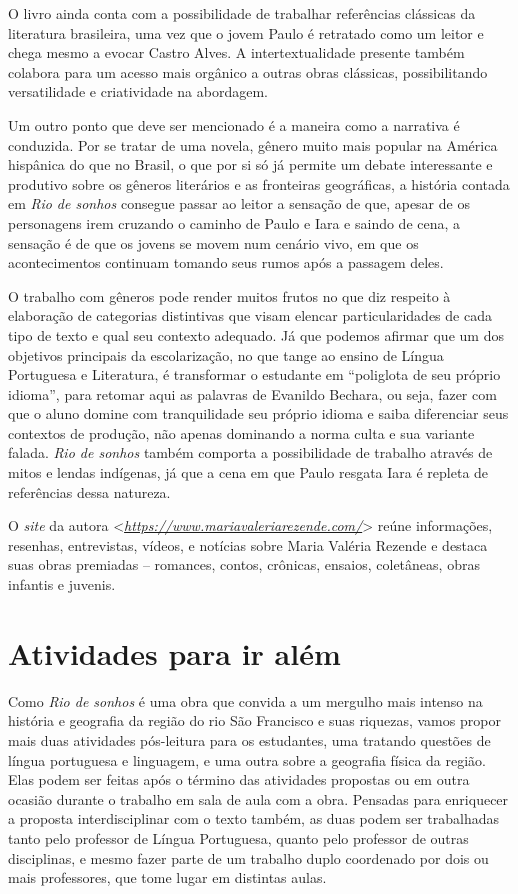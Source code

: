 \documentclass{extarticle}
\begin{document}
  O livro ainda conta com a possibilidade de trabalhar referências
  clássicas da literatura brasileira, uma vez que o jovem Paulo é
  retratado como um leitor e chega mesmo a evocar Castro Alves. A
  intertextualidade presente também colabora para um acesso mais
  orgânico a outras obras clássicas, possibilitando versatilidade e
  criatividade na abordagem.

  Um outro ponto que deve ser mencionado é a maneira como a narrativa é
  conduzida. Por se tratar de uma novela, gênero muito mais popular na
  América hispânica do que no Brasil, o que por si só já permite um
  debate interessante e produtivo sobre os gêneros literários e as
  fronteiras geográficas, a história contada em \emph{Rio de sonhos}
  consegue passar ao leitor a sensação de que, apesar de os personagens
  irem cruzando o caminho de Paulo e Iara e saindo de cena, a sensação é
  de que os jovens se movem num cenário vivo, em que os acontecimentos
  continuam tomando seus rumos após a passagem deles.

  O trabalho com gêneros pode render muitos frutos no que diz respeito à
  elaboração de categorias distintivas que visam elencar
  particularidades de cada tipo de texto e qual seu contexto adequado.
  Já que podemos afirmar que um dos objetivos principais da
  escolarização, no que tange ao ensino de Língua Portuguesa e
  Literatura, é transformar o estudante em ``poliglota de seu próprio
  idioma'', para retomar aqui as palavras de Evanildo Bechara, ou seja,
  fazer com que o aluno domine com tranquilidade seu próprio idioma e
  saiba diferenciar seus contextos de produção, não apenas dominando a
  norma culta e sua variante falada. \emph{Rio de sonhos} também
  comporta a possibilidade de trabalho através de mitos e lendas
  indígenas, já que a cena em que Paulo resgata Iara é repleta de
  referências dessa natureza.

  O \emph{site} da autora
  \textless{}\href{https://www.mariavaleriarezende.com/}{\emph{https://www.mariavaleriarezende.com/}}\textgreater{}
  reúne informações, resenhas, entrevistas, vídeos, e notícias sobre
  Maria Valéria Rezende e destaca suas obras premiadas -- romances,
  contos, crônicas, ensaios, coletâneas, obras infantis e juvenis.

  \section{Atividades para ir além}

  Como \emph{Rio de sonhos} é uma obra que convida a um mergulho mais
  intenso na história e geografia da região do rio São Francisco e suas
  riquezas, vamos propor mais duas atividades pós-leitura para os
  estudantes, uma tratando questões de língua portuguesa e linguagem, e
  uma outra sobre a geografia física da região. Elas podem ser feitas
  após o término das atividades propostas ou em outra ocasião durante o
  trabalho em sala de aula com a obra. Pensadas para enriquecer a
  proposta interdisciplinar com o texto também, as duas podem ser
  trabalhadas tanto pelo professor de Língua Portuguesa, quanto pelo
  professor de outras disciplinas, e mesmo fazer parte de um trabalho
  duplo coordenado por dois ou mais professores, que tome lugar em
  distintas aulas.
\end{document}
